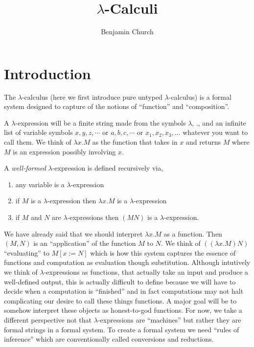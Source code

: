 \documentclass[12pt]{article}
\begin{document}
\author{Benjamin Church}
\title{\Huge $\lambda$-Calculi}

\section{Introduction}

\renewcommand{\red}{\triangleright}
\newcommand{\aconv}{\equiv_{\alpha}}
\newcommand{\bredo}{\red_{\beta,1}}
\newcommand{\bred}{\red_{\beta}}
\newcommand{\etared}{\red_{\eta}}
\newcommand{\etaredo}{\red_{\eta,1}}
\newcommand{\bered}{\red_{\beta\eta}}
\newcommand{\beredo}{\red_{\beta\eta,1}}

The $\lambda$-calculus (here we first introduce pure untyped $\lambda$-calculus) is a formal system designed to capture of the notions of ``function'' and ``composition''.

\begin{rmk}
A $\lambda$-expression will be a finite string made from the symbols $\lambda$, $.$, and an infinite list of variable symbols $x, y, z, \cdots$ or $a,b,c, \cdots$ or $x_1, x_2, x_3, \dots$ whatever you want to call them. We think of $\lambda x . M$ as the function that takes in $x$ and returns $M$ where $M$ is an expression possibly involving $x$. 
\end{rmk} 

\begin{defn}
A \textit{well-formed} $\lambda$-expression is defined recursively via,
\begin{enumerate}
\item any variable is a $\lambda$-expression
\item if $M$ is a $\lambda$-expression then $\lambda x . M$ is a $\lambda$-expression
\item if $M$ and $N$ are $\lambda$-expressions then $(M N)$ is a $\lambda$-expression.
\end{enumerate}
\end{defn}

\begin{rmk}
We have already said that we should interpret $\lambda x . M$ as a function. Then $(M, N)$ is an ``application'' of the function $M$ to $N$. We think of $((\lambda x . M) N)$ ``evaluating'' to $M[x := N]$ which is how this system captures the essence of functions and computation as evaluation though substitution. Although intutively we think of $\lambda$-expressions as functions, that actually take an input and produce a well-defined output, this is actually difficult to define because we will have to decide when a computation is ``finished'' and in fact computations may not halt complicating our desire to call these things functions. A major goal will be to somehow interpret these objects as honest-to-god functions. For now, we take a different perspective not that $\lambda$-expressions are ``machines'' but rather they are formal strings in a formal system. To create a formal system we need ``rules of inference'' which are conventionally called conversions and reductions.
\end{rmk}
\end{document}
